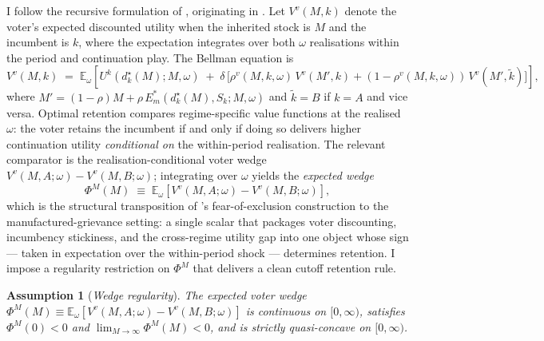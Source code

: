 \documentclass[11pt,twoside]{extarticle}
\newtheorem{assumption}{Assumption}
\begin{document}
I follow the recursive formulation of \citet{acharyaPoliticalAccountabilityMoral2025}, originating in \citet{spearOnRepeatedMoralHazard1987}. Let $V^v(M,k)$ denote the voter's expected discounted utility when the inherited stock is $M$ and the incumbent is $k$, where the expectation integrates over both $\omega$ realisations within the period and continuation play. The Bellman equation is
\begin{equation}\label{eq:bellman_v2}
    V^v(M,k)\;=\;\mathbb{E}_\omega\!\left[U^k(d_k^\star(M);M,\omega)\;+\;\delta\,\big[\rho^v(M,k,\omega)\,V^v(M',k)+(1-\rho^v(M,k,\omega))\,V^v(M',\tilde k)\big]\right],
\end{equation}
where $M'=(1-\rho)M+\rho\,E_m^*(d_k^\star(M),S_k;M,\omega)$ and $\tilde k=B$ if $k=A$ and vice versa. Optimal retention compares regime-specific value functions at the realised $\omega$: the voter retains the incumbent if and only if doing so delivers higher continuation utility \emph{conditional on} the within-period realisation. The relevant comparator is the realisation-conditional voter wedge $V^v(M,A;\omega)-V^v(M,B;\omega)$; integrating over $\omega$ yields the \emph{expected wedge}
\begin{equation}\label{eq:wedge_v2}
    \Phi^M(M)\;\equiv\;\mathbb{E}_\omega\!\left[V^v(M,A;\omega)-V^v(M,B;\omega)\right],
\end{equation}
which is the structural transposition of \citet{padróimiquelControlPoliticiansDivided2007}'s fear-of-exclusion construction to the manufactured-grievance setting: a single scalar that packages voter discounting, incumbency stickiness, and the cross-regime utility gap into one object whose sign — taken in expectation over the within-period shock — determines retention. I impose a regularity restriction on $\Phi^M$ that delivers a clean cutoff retention rule.

\begin{assumption}[\emph{Wedge regularity}]\label{ass:wedge}
The expected voter wedge $\Phi^M(M)\equiv\mathbb{E}_\omega[V^v(M,A;\omega)-V^v(M,B;\omega)]$ is continuous on $[0,\infty)$, satisfies $\Phi^M(0)<0$ and $\lim_{M\to\infty}\Phi^M(M)<0$, and is strictly quasi-concave on $[0,\infty)$.
\end{assumption}
\end{document}
